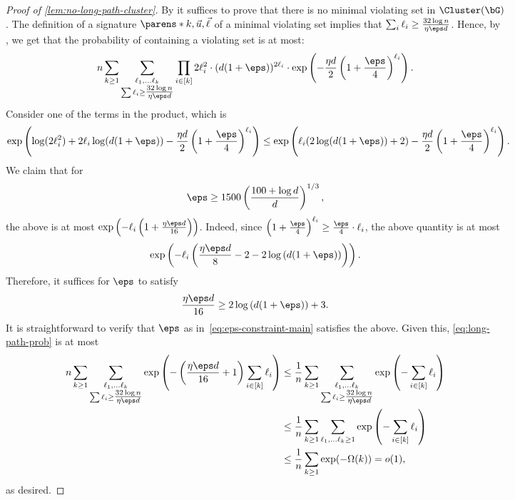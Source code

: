 \documentclass[11pt,letterpaper]{article}
\begin{document}
\begin{figure}
\begin{figure}
    \begin{proof}[Proof of \cref{lem:no-long-path-cluster}]
        By  it suffices to prove that there is no minimal violating set in $\Cluster(\bG)$.
        The definition of a signature $\parens*{k,\vec{u},\vec{\ell}}$ of a minimal violating set implies that $\sum_i\ell_i \ge \frac{32\log n}{\eta\eps d}$.
        Hence, by , we get that the probability of containing a violating set is at most:
        \begin{align}\label{eq:long-path-prob}
            n \sum_{k \ge 1} \sum_{\substack{\ell_1, \ldots \ell_k \\ \sum \ell_i \ge \tfrac{32\log n}{\eta\eps d}}} \prod_{i \in [k]} 2\ell_i^2 \cdot (d(1+\eps))^{2\ell_i} \cdot \exp\left(-\frac{\eta d}{2}\left(1+\frac{\eps}{4}\right)^{\ell_i}\right).
        \end{align}
        Consider one of the terms in the product, which is
        \[
            \exp\left(\log(2\ell_i^2) + 2\ell_i \log (d(1+\eps)) - \frac{\eta d}{2}\left(1+\frac{\eps}{4}\right)^{\ell_i}\right) \le \exp\left(\ell_i (2\log (d(1+\eps))+2) - \frac{\eta d}{2}\left(1+\frac{\eps}{4}\right)^{\ell_i}\right).
        \]
        We claim that for
        \begin{equation}
            \label{eq:eps-constraint-main}
            \eps \ge 1500 \left( \frac{100+\log d}{d} \right)^{1/3},
        \end{equation}
        the above is at most $\exp \left( - \ell_i \left( 1 + \frac{\eta \eps d}{16} \right) \right)$.
        Indeed, since $\left(1+\frac{\eps}{4}\right)^{\ell_i} \ge \frac{\eps}{4} \cdot \ell_i$, the above quantity is at most
        \[
            \exp\left( - \ell_i \left( \frac{\eta \eps d}{8} - 2 - 2 \log\left( d (1+\eps) \right) \right) \right).
        \]
        Therefore, it suffices for $\eps$ to satisfy
        \[
            \frac{\eta \eps d}{16} \ge 2 \log \left( d (1+\eps) \right) + 3.
        \]
        It is straightforward to verify that $\eps$ as in~\eqref{eq:eps-constraint-main} satisfies the above.
        Given this, \eqref{eq:long-path-prob} is at most
        \begin{align*}
            n \sum_{k \ge 1} \sum_{\substack{\ell_1, \ldots \ell_k \\ \sum \ell_i \ge \tfrac{32\log n}{\eta\eps d}}} \exp\left(-\left(\frac{\eta\eps d}{16} + 1\right)\sum_{i \in [k]} \ell_i\right) & 
            \le \frac{1}{n} \sum_{k \ge 1} \sum_{\substack{\ell_1, \ldots \ell_k \\ \sum \ell_i \ge \tfrac{32\log n}{\eta\eps d}}} \exp\left(-\sum_{i \in [k]} \ell_i\right) \\
            &\le \frac{1}{n} \sum_{k \ge 1} \sum_{\ell_1, \ldots \ell_k \ge 1} \exp\left(-\sum_{i \in [k]} \ell_i\right) \\
            &\le \frac{1}{n} \sum_{k \ge 1} \exp(-\Omega(k)) = o(1),
        \end{align*}
        as desired.
    \end{proof}


\end{figure}
\end{figure}
\end{document}
